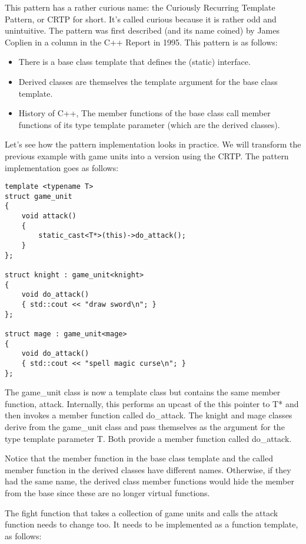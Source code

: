 
This pattern has a rather curious name: the Curiously Recurring Template Pattern, or CRTP for short. It’s called curious because it is rather odd and unintuitive. The pattern was first described (and its name coined) by James Coplien in a column in the C++ Report in 1995. This pattern is as follows:

\begin{itemize}
\item
There is a base class template that defines the (static) interface.

\item
Derived classes are themselves the template argument for the base class template.

\item
History of C++, The member functions of the base class call member functions of its type template parameter (which are the derived classes).
\end{itemize}

Let’s see how the pattern implementation looks in practice. We will transform the previous example with game units into a version using the CRTP. The pattern implementation goes as follows:

\begin{lstlisting}[style=styleCXX]
template <typename T>
struct game_unit
{
	void attack()
	{
		static_cast<T*>(this)->do_attack();
	}
};

struct knight : game_unit<knight>
{
	void do_attack()
	{ std::cout << "draw sword\n"; }
};

struct mage : game_unit<mage>
{
	void do_attack()
	{ std::cout << "spell magic curse\n"; }
};
\end{lstlisting}

The game\_unit class is now a template class but contains the same member function, attack. Internally, this performs an upcast of the this pointer to T* and then invokes a member function called do\_attack. The knight and mage classes derive from the game\_unit class and pass themselves as the argument for the type template parameter T. Both provide a member function called do\_attack.

Notice that the member function in the base class template and the called member function in the derived classes have different names. Otherwise, if they had the same name, the derived class member functions would hide the member from the base since these are no longer virtual functions.

The fight function that takes a collection of game units and calls the attack function needs to change too. It needs to be implemented as a function template, as follows:

